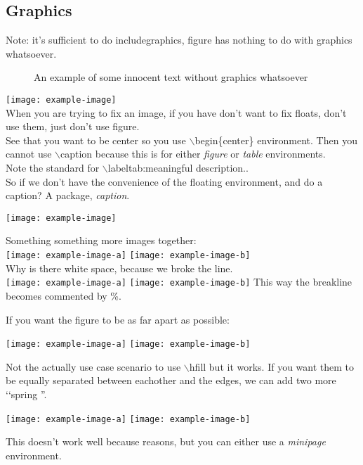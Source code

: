 \documentclass[11pt,a4paper,oneside,openany]{book}
\begin{document}
\subsection{Graphics}
Note: it's sufficient to do includegraphics, figure has nothing to do with graphics whatsoever. \\
\begin{figure}
    An example of some innocent text without graphics whatsoever
\end{figure}
\texttt{[image: example-image]}
\\ When you are trying to fix an image, if you have don't want to fix floats, don't use them, just don't use figure.
\\ See that you want to be center so you use \(\backslash\)begin\{center\} environment. Then you cannot use \(\backslash\)caption{} because this is for either \emph{figure} or \emph{table} environments.
\\ Note the standard for \(\backslash\)label{tab:meaningful description.}.
\\ So if we don't have the convenience of the floating environment, and do a caption? A package, \emph{caption}.\\ 
\begin{center}
    \texttt{[image: example-image]}
    \label{img:ahah}
\end{center}

Something something more images together: \\

\texttt{[image: example-image-a]}
\texttt{[image: example-image-b]}
\\ Why is there white space, because we broke the line. \\
\texttt{[image: example-image-a]}%
\texttt{[image: example-image-b]}
This way the breakline becomes commented by \%.

If you want the figure to be as far apart as possible:

\begin{center}
    \texttt{[image: example-image-a]}\hfill
    \texttt{[image: example-image-b]}
\end{center}
Not the actually use case scenario to use \(\backslash\)hfill but it works.
If you want them to be equally separated between eachother and the edges, we can add two more \lq\lq spring ''.
\begin{center}
    \hfill
    \texttt{[image: example-image-a]}\hfill
    \texttt{[image: example-image-b]} \hfill
\end{center}
This doesn't work well because reasons, but you can either use a \emph{minipage} environment. \\
\end{document}

